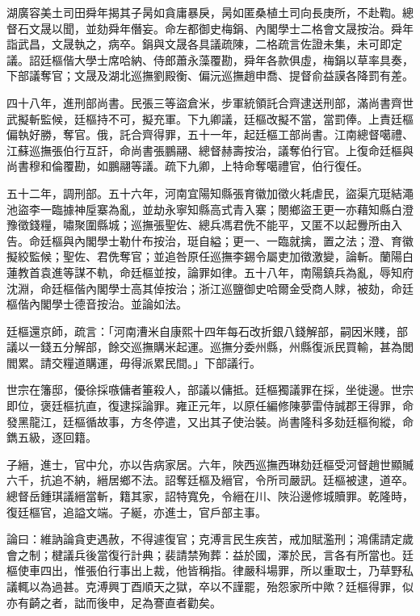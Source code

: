 \begin{pinyinscope}
湖廣容美土司田舜年揭其子昺如貪庸暴戾，昺如匿桑植土司向長庚所，不赴鞫。總督石文晟以聞，並劾舜年僭妄。命左都御史梅鋗、內閣學士二格會文晟按治。舜年詣武昌，文晟執之，病卒。鋗與文晟各具議疏陳，二格疏言佐證未集，未可即定議。詔廷樞偕大學士席哈納、侍郎蕭永藻覆勘，舜年各款俱虛，梅鋗以草率具奏，下部議奪官；文晟及湖北巡撫劉殿衡、偏沅巡撫趙申喬、提督俞益謨各降罰有差。

四十八年，進刑部尚書。民張三等盜倉米，步軍統領託合齊逮送刑部，滿尚書齊世武擬斬監候，廷樞持不可，擬充軍。下九卿議，廷樞改擬不當，當罰俸。上責廷樞偏執好勝，奪官。俄，託合齊得罪，五十一年，起廷樞工部尚書。江南總督噶禮、江蘇巡撫張伯行互訐，命尚書張鵬翮、總督赫壽按治，議奪伯行官。上復命廷樞與尚書穆和倫覆勘，如鵬翮等議。疏下九卿，上特命奪噶禮官，伯行復任。

五十二年，調刑部。五十六年，河南宜陽知縣張育徽加徵火耗虐民，盜渠亢珽結澠池盜李一臨據神垕寨為亂，並劫永寧知縣高式青入寨；閿鄉盜王更一亦藉知縣白澄豫徵錢糧，嘯聚圍縣城；巡撫張聖佐、總兵馮君侁不能平，又匿不以起釁所由入告。命廷樞與內閣學士勒什布按治，珽自縊；更一、一臨就擒，置之法；澄、育徽擬絞監候；聖佐、君侁奪官；並追咎原任巡撫李錫令屬吏加徵激變，論斬。蘭陽白蓮教首袁進等謀不軌，命廷樞並按，論罪如律。五十八年，南陽鎮兵為亂，辱知府沈淵，命廷樞偕內閣學士高其倬按治；浙江巡鹽御史哈爾金受商人賕，被劾，命廷樞偕內閣學士德音按治。並論如法。

廷樞還京師，疏言：「河南漕米自康熙十四年每石改折銀八錢解部，嗣因米賤，部議以一錢五分解部，餘交巡撫購米起運。巡撫分委州縣，州縣復派民買輸，甚為閭閻累。請交糧道購運，毋得派累民間。」下部議行。

世宗在籓邸，優徐採嗾傭者箠殺人，部議以傭抵。廷樞獨議罪在採，坐徙邊。世宗即位，褒廷樞抗直，復逮採論罪。雍正元年，以原任編修陳夢雷侍誠郡王得罪，命發黑龍江，廷樞循故事，方冬停遣，又出其子使治裝。尚書隆科多劾廷樞徇縱，命鐫五級，逐回籍。

子縉，進士，官中允，亦以告病家居。六年，陜西巡撫西琳劾廷樞受河督趙世顯贓六千，抗追不納，縉居鄉不法。詔奪廷樞及縉官，令所司嚴訊。廷樞被逮，道卒。總督岳鍾琪議縉當斬，籍其家，詔特寬免，令縉在川、陜沿邊修城贖罪。乾隆時，復廷樞官，追謚文端。子綖，亦進士，官戶部主事。

論曰：維訥論貪吏遇赦，不得遽復官；克溥言民生疾苦，戒加賦濫刑；鴻儒請定歲會之制；楗議兵後當復行計典；裴請禁殉葬：益於國，澤於民，言各有所當也。廷樞使車四出，惟張伯行事出上裁，他皆稱指。律嚴科場罪，所以重取士，乃草野私議輒以為過甚。克溥興丁酉順天之獄，卒以不謹罷，殆怨家所中歟？廷樞得罪，似亦有齮之者，詘而後申，足為謇直者勸矣。


\end{pinyinscope}